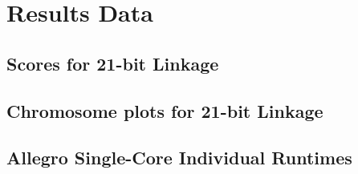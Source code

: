 \section{Results Data}
\subsection{Scores for 21-bit Linkage}\label{ref:app:21bitscores}
\subsection{Chromosome plots for 21-bit Linkage}\label{ref:app:21bitplots}

\pagebreak
\subsection{Allegro Single-Core Individual Runtimes}\label{ref:app:singlecoreindiv}

